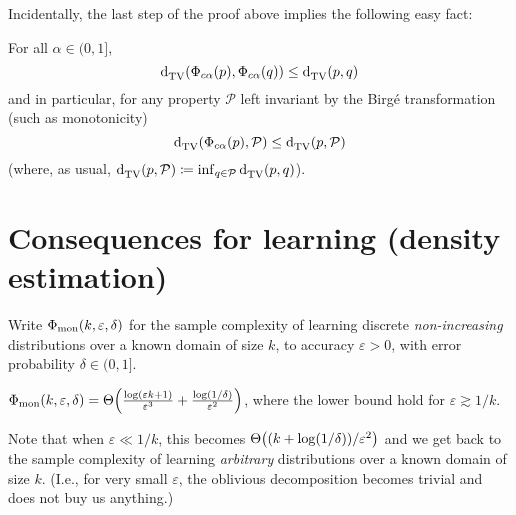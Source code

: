\documentclass[11pt]{article}
\newcommand{\dst}{\varepsilon}
\newcommand{\ab}{k}
\renewcommand{\eqdef}{\coloneqq}
\newcommand{\p}{p}
\newcommand{\q}{q}
\begin{document}
\noindent Incidentally, the last step of the proof above implies the following easy fact:
\begin{fact}\label{fact:birge:shrinking}
  For all $\alpha\in(0,1]$,
  \begin{equation}
  \totalvardist{\birge[\p]{c\alpha}}{\birge[\q]{c\alpha}} \leq \totalvardist{\p}{\q}
  \end{equation}
  and in particular, for any property $\mathcal{P}$ left invariant by the Birg\'e transformation (such as monotonicity)
  \begin{equation}
  \totalvardist{\birge[\p]{c\alpha}}{\mathcal{P}} \leq \totalvardist{\p}{\mathcal{P}}
  \end{equation}
  (where, as usual, $\totalvardist{\p}{\mathcal{P}} \eqdef \inf_{\q\in\mathcal{P} }\totalvardist{\p}{\q}$).
\end{fact}

\section{Consequences for learning (density estimation)}

Write $\Phi_{\rm mon}(\ab,\dst,\delta)$ for the sample complexity of learning discrete \emph{non-increasing} distributions over a known domain of size $\ab$, to accuracy $\dst>0$, with error probability $\delta\in(0,1]$.

\begin{theorem}\label{theo:learning:tv}
  $\Phi_{\rm mon}(\ab,\dst,\delta) = \bigTheta{\frac{\log(\dst\ab+1)}{\dst^3}+\frac{\log(1/\delta)}{\dst^2}}$, where the lower bound hold for $\dst \gtrsim 1/\ab$.
\end{theorem}
\noindent Note that when $\dst \ll 1/\ab$, this becomes $\bigTheta{(\ab+\log(1/\delta))/\dst^2}$ and we get back to the sample complexity of learning \emph{arbitrary} distributions over a known domain of size $\ab$. (I.e., for very small $\dst$, the oblivious decomposition becomes trivial and does not buy us anything.)
\end{document}
